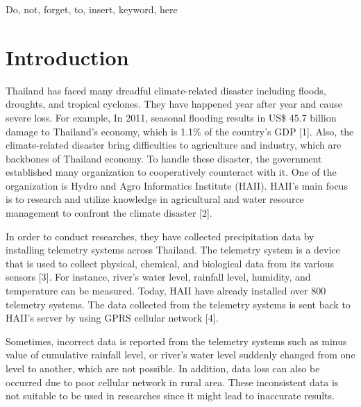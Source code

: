 \documentclass[conference]{IEEEtran}
\begin{document}
\begin{IEEEkeywords}
\color{red} Do, not, forget, to, insert, keyword, here
\end{IEEEkeywords}

\IEEEpeerreviewmaketitle

\section{Introduction}

Thailand has faced many dreadful climate-related disaster including floods, droughts, and tropical cyclones. They have happened year after year and cause severe loss. For example, In 2011, seasonal flooding results in US\$ 45.7 billion damage to Thailand’s economy, which is 1.1\% of the country’s GDP [1]. Also, the climate-related disaster bring difficulties to agriculture and industry, which are backbones of Thailand economy. To handle these disaster, the government established many organization to cooperatively counteract with it. One of the organization is Hydro and Agro Informatics Institute (HAII). HAII’s main focus is to research and utilize knowledge in agricultural and water resource management to confront the climate disaster [2].

In order to conduct researches, they have collected precipitation data by installing telemetry systems across Thailand. The telemetry system is a device that is used to collect physical, chemical, and biological data from its various sensors [3]. For instance, river’s water level, rainfall level, humidity, and temperature can be measured. Today, HAII have already installed over 800 telemetry systems. The data collected from the telemetry systems is sent back to HAII’s server by using GPRS cellular network [4].

Sometimes, incorrect data is reported from the telemetry systems such as minus value of cumulative rainfall level, or river’s water level suddenly changed from one level to another, which are not possible. In addition, data loss can also be occurred due to poor cellular network in rural area. These inconsistent data is not suitable to be used in researches since it might lead to inaccurate results.
\end{document}
